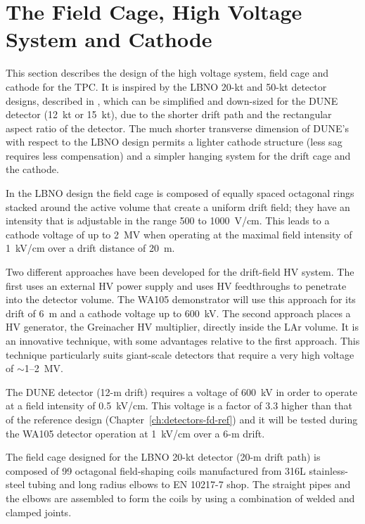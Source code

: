 \section{The Field Cage, High Voltage System and Cathode} 
\label{sec:detectors-fd-alt-hv}

This section describes the design of the high voltage system, field
cage and cathode for the TPC.  It is inspired by the LBNO 20-kt and
50-kt detector designs, described in \anxlbnob, which can
be simplified and down-sized for the DUNE detector (12~kt or 15~kt),
due to the shorter drift path and the rectangular aspect ratio of the
detector. The much shorter transverse dimension of DUNE's with respect
to the LBNO design permits a lighter cathode structure (less sag
requires less compensation) and a simpler hanging system for the drift
cage and the cathode.

In the LBNO design the field cage is composed of equally spaced
octagonal rings stacked around the active volume 
that create a uniform drift field; they have an intensity 
 that is adjustable in the range 500 to 1000~V/cm. This
leads to a cathode voltage of up to 2~MV when operating at the maximal field 
intensity of 1~kV/cm over a drift distance of 20~m.

Two different approaches have been developed for the drift-field HV
system.   
The first uses an external HV power supply and uses
HV feedthroughs to penetrate into the detector volume. The WA105
demonstrator will use this approach for its drift of 6~m and a cathode
voltage up to 600~kV.  The second approach places a HV generator, the Greinacher HV
multiplier, directly inside the LAr volume. It is an innovative technique, with some advantages
relative to the first approach. This technique particularly suits
giant-scale detectors that require a very high voltage of
$\sim$1--2~MV.

The DUNE detector (12-m drift) requires a voltage of 600~kV in order
to operate at a field intensity of 0.5~kV/cm. This voltage is a factor
of 3.3 higher than that of the reference design
(Chapter~\ref{ch:detectors-fd-ref}) and it will be tested during the
WA105 detector operation at 1~kV/cm over a 6-m drift.

The field cage designed for the LBNO 20-kt detector (20-m drift path)
is composed of 99 octagonal field-shaping coils manufactured from 316L
stainless-steel tubing and long radius elbows to EN 10217-7 shop.   The
straight pipes and the elbows are assembled to form the coils
by using a combination of welded and clamped joints.

